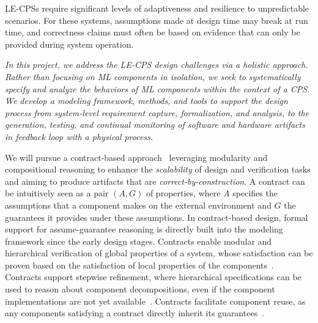 LE-CPSs require significant levels of adaptiveness and resilience to unpredictable scenarios. 
For these systems, assumptions made at design time may break at run time, and correctness claims must often be  based on evidence that can only be provided during system operation.  

\emph{In this project, we address the LE-CPS design challenges via a holistic approach. 
Rather than focusing on ML components in isolation, we seek to systematically specify and analyze the behaviors of ML components within the context of a CPS. 
We develop a modeling framework, methods, and tools to support the design process from system-level requirement capture, formalization, and analysis, to the generation, testing, and continual monitoring of software and hardware artifacts in feedback loop with a physical process.}

We will pursue a contract-based approach~\cite{Nuzzo15b,Sangiovanni-Vincentelli2012a} leveraging modularity and compositional reasoning to enhance the \emph{scalability} of design and verification tasks and aiming to produce artifacts that are \emph{correct-by-construction}. 
A contract can be intuitively seen as a pair $(A,G)$ of properties, where $A$ specifies the assumptions that a component makes on the external environment and $G$ the guarantees it provides under these assumptions. In contract-based design, formal support for assume-guarantee reasoning is directly built into the modeling framework since the early design stages. Contracts enable modular and hierarchical verification of global properties of a system, whose satisfaction can be proven based on the satisfaction of local properties of the components~\cite{Cimatti15b}. Contracts support stepwise refinement, where hierarchical specifications can be used to reason about component decompositions, even if the component implementations are not yet available~\cite{Cimatti15b,Nuzzo14,Iannopollo14}. Contracts facilitate component reuse, as any components satisfying a contract directly inherit its guarantees~\cite{Iannopollo14}. 
% 

